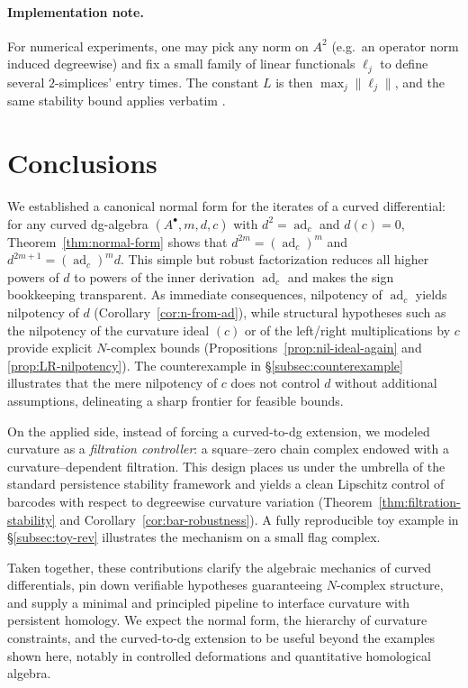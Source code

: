 \documentclass[preprint,12pt]{elsarticle}
\newcommand{\ad}{\operatorname{ad}}
\begin{document}
\paragraph{Implementation note.}
For numerical experiments, one may pick any norm on $A^2$ (e.g.\ an operator norm induced
degreewise) and fix a small family of linear functionals $\ell_j$ to define several $2$-simplices'
entry times. The constant $L$ is then $\max_j\|\ell_j\|$, and the same stability bound applies
verbatim \cite{CohenSteinerEdelsbrunnerHarer2007,ChazalDeSilvaGlisseOudot2016}.


\section{Conclusions}\label{sec:conclusions}

We established a canonical normal form for the iterates of a curved differential:
for any curved dg-algebra $(A^\bullet,m,d,c)$ with $d^2=\ad_c$ and $d(c)=0$,
Theorem~\ref{thm:normal-form} shows that $d^{2m}=(\ad_c)^m$ and $d^{2m+1}=(\ad_c)^m d$.
This simple but robust factorization reduces all higher powers of $d$ to powers of
the inner derivation $\ad_c$ and makes the sign bookkeeping transparent.
As immediate consequences, nilpotency of $\ad_c$ yields nilpotency of $d$
(Corollary~\ref{cor:n-from-ad}), while structural hypotheses such as the
nilpotency of the curvature ideal $(c)$ or of the left/right multiplications by $c$
provide explicit $N$-complex bounds (Propositions~\ref{prop:nil-ideal-again} and \ref{prop:LR-nilpotency}).
The counterexample in §\ref{subsec:counterexample} illustrates that the mere nilpotency of $c$
does not control $d$ without additional assumptions, delineating a sharp frontier for feasible bounds.

On the applied side, instead of forcing a curved-to-dg extension, we modeled curvature
as a \emph{filtration controller}: a square–zero chain complex endowed with a
curvature–dependent filtration. This design places us under the umbrella of the
standard persistence stability framework and yields a clean Lipschitz control of
barcodes with respect to degreewise curvature variation
(Theorem~\ref{thm:filtration-stability} and Corollary~\ref{cor:bar-robustness}).
A fully reproducible toy example in §\ref{subsec:toy-rev} illustrates the mechanism
on a small flag complex.

Taken together, these contributions clarify the algebraic mechanics of curved differentials,
pin down verifiable hypotheses guaranteeing $N$-complex structure, and supply a minimal
and principled pipeline to interface curvature with persistent homology.
We expect the normal form, the hierarchy of curvature constraints, and the curved-to-dg extension
to be useful beyond the examples shown here, notably in controlled deformations and quantitative
homological algebra.
\end{document}
